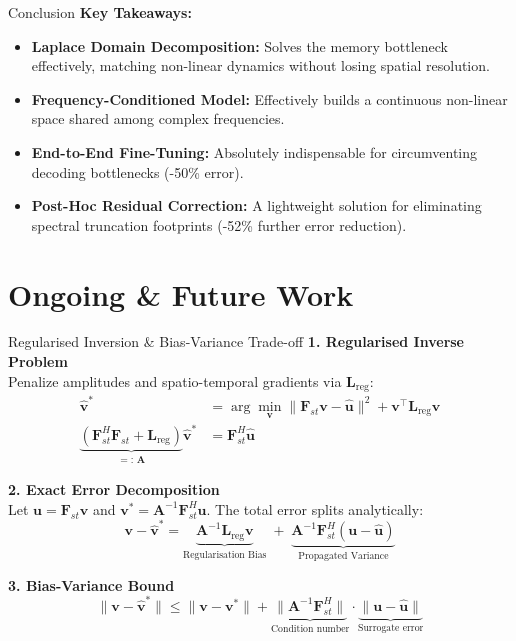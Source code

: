 \documentclass[aspectratio=169]{beamer}
\begin{document}
\begin{frame}{Conclusion}
  \textbf{Key Takeaways:}
  \begin{itemize}
      \item \textbf{Laplace Domain Decomposition:} Solves the memory bottleneck effectively, matching non-linear dynamics without losing spatial resolution.
      \item \textbf{Frequency-Conditioned Model:} Effectively builds a continuous non-linear space shared among complex frequencies.
      \item \textbf{End-to-End Fine-Tuning:} Absolutely indispensable for circumventing decoding bottlenecks (-50\% error).
      \item \textbf{Post-Hoc Residual Correction:} A lightweight solution for eliminating spectral truncation footprints (-52\% further error reduction).
  \end{itemize}
\end{frame}

\section{Ongoing \& Future Work}

\begin{frame}{Regularised Inversion \& Bias-Variance Trade-off}
  \textbf{1. Regularised Inverse Problem}\\
  Penalize amplitudes and spatio-temporal gradients via $\mathbf{L}_{\mathrm{reg}}$:
  \vspace{-0.5em}
  \begin{align*}
      \hat{\mathbf{v}}^* &= \arg\min_{\mathbf{v}} \|\mathbf{F}_{st}\mathbf{v} - \hat{\mathbf{u}}\|^2 + \mathbf{v}^\top \mathbf{L}_{\mathrm{reg}} \mathbf{v} \\
      \underbrace{(\mathbf{F}_{st}^H\mathbf{F}_{st} + \mathbf{L}_{\mathrm{reg}})}_{=:\,\mathbf{A}} \hat{\mathbf{v}}^* &= \mathbf{F}_{st}^H \hat{\mathbf{u}}
  \end{align*}
  
  \textbf{2. Exact Error Decomposition}\\
  Let $\mathbf{u} = \mathbf{F}_{st}\mathbf{v}$ and $\mathbf{v}^* = \mathbf{A}^{-1}\mathbf{F}_{st}^H\mathbf{u}$. The total error splits analytically:
  \vspace{-0.5em}
  \[ \mathbf{v} - \hat{\mathbf{v}}^* = \underbrace{\mathbf{A}^{-1}\mathbf{L}_{\mathrm{reg}}\mathbf{v}}_{\text{Regularisation Bias}} \;+\; \underbrace{\mathbf{A}^{-1}\mathbf{F}_{st}^H (\mathbf{u} - \hat{\mathbf{u}})}_{\text{Propagated Variance}} \]
  
  \textbf{3. Bias-Variance Bound}\\
  \vspace{-0.5em}
  \[ \|\mathbf{v} - \hat{\mathbf{v}}^*\| \leq \|\mathbf{v} - \mathbf{v}^*\| + \underbrace{\|\mathbf{A}^{-1}\mathbf{F}_{st}^H\|}_{\text{Condition number}} \cdot \underbrace{\|\mathbf{u} - \hat{\mathbf{u}}\|}_{\text{Surrogate error}} \]
\end{frame}
\end{document}
